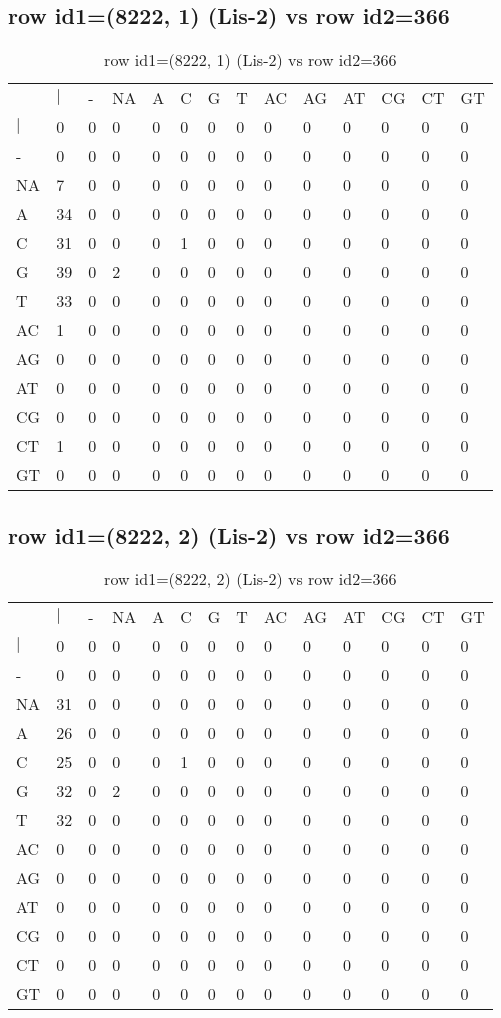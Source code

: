 \subsection{row id1=(8222, 1) (Lis-2) vs row id2=366}
\begin{center}
\begin{longtable}{|l|l|l|l|l|l|l|l|l|l|l|l|l|l|}
\caption{row id1=(8222, 1) (Lis-2) vs row id2=366} \label{table_dm156}\\
\hline
\\
\hline
&$|$&-&NA&A&C&G&T&AC&AG&AT&CG&CT&GT\\
$|$&0&0&0&0&0&0&0&0&0&0&0&0&0\\
-&0&0&0&0&0&0&0&0&0&0&0&0&0\\
NA&7&0&0&0&0&0&0&0&0&0&0&0&0\\
A&34&0&0&0&0&0&0&0&0&0&0&0&0\\
C&31&0&0&0&1&0&0&0&0&0&0&0&0\\
G&39&0&2&0&0&0&0&0&0&0&0&0&0\\
T&33&0&0&0&0&0&0&0&0&0&0&0&0\\
AC&1&0&0&0&0&0&0&0&0&0&0&0&0\\
AG&0&0&0&0&0&0&0&0&0&0&0&0&0\\
AT&0&0&0&0&0&0&0&0&0&0&0&0&0\\
CG&0&0&0&0&0&0&0&0&0&0&0&0&0\\
CT&1&0&0&0&0&0&0&0&0&0&0&0&0\\
GT&0&0&0&0&0&0&0&0&0&0&0&0&0\\
\hline
\end{longtable}
\end{center}

\subsection{row id1=(8222, 2) (Lis-2) vs row id2=366}
\begin{center}
\begin{longtable}{|l|l|l|l|l|l|l|l|l|l|l|l|l|l|}
\caption{row id1=(8222, 2) (Lis-2) vs row id2=366} \label{table_dm158}\\
\hline
\\
\hline
&$|$&-&NA&A&C&G&T&AC&AG&AT&CG&CT&GT\\
$|$&0&0&0&0&0&0&0&0&0&0&0&0&0\\
-&0&0&0&0&0&0&0&0&0&0&0&0&0\\
NA&31&0&0&0&0&0&0&0&0&0&0&0&0\\
A&26&0&0&0&0&0&0&0&0&0&0&0&0\\
C&25&0&0&0&1&0&0&0&0&0&0&0&0\\
G&32&0&2&0&0&0&0&0&0&0&0&0&0\\
T&32&0&0&0&0&0&0&0&0&0&0&0&0\\
AC&0&0&0&0&0&0&0&0&0&0&0&0&0\\
AG&0&0&0&0&0&0&0&0&0&0&0&0&0\\
AT&0&0&0&0&0&0&0&0&0&0&0&0&0\\
CG&0&0&0&0&0&0&0&0&0&0&0&0&0\\
CT&0&0&0&0&0&0&0&0&0&0&0&0&0\\
GT&0&0&0&0&0&0&0&0&0&0&0&0&0\\
\hline
\end{longtable}
\end{center}

